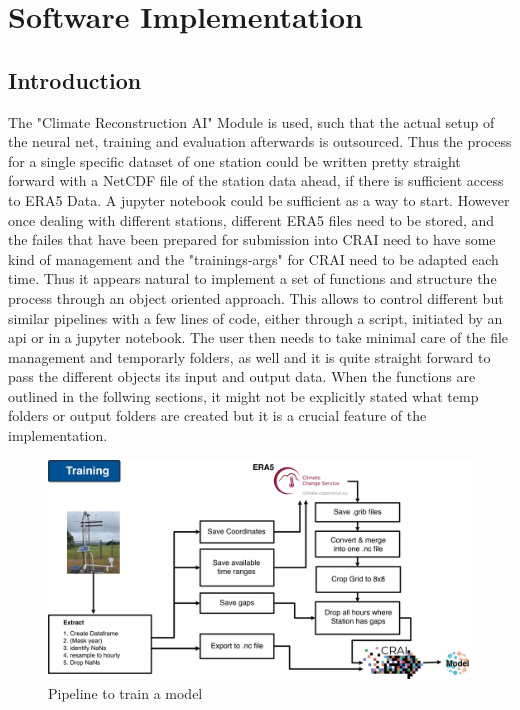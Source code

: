 \section{Software Implementation}
\label{sec:implementation}

\subsection{Introduction}

The "Climate Reconstruction AI" Module is used, such that the actual setup of the neural net, training and evaluation afterwards is outsourced. Thus the process for a single specific dataset of one station could be written pretty straight forward with a NetCDF file of the station data ahead, if there is sufficient access to ERA5 Data. A jupyter notebook could be sufficient as a way to start. However once dealing with different stations, different ERA5 files need to be stored, and the failes that have been prepared for submission into CRAI need to have some kind of management and the "trainings-args" for CRAI need to be adapted each time. Thus it appears natural to implement a set of functions and structure the process through an object oriented approach. This allows to control different but similar pipelines with a few lines of code, either through a script, initiated by an api or in a jupyter notebook.
The user then needs to take minimal care of the file management and temporarly folders, as well and it is quite straight forward to pass the different objects its input and output data. When the functions are outlined in the follwing sections, it might not be explicitly stated what temp folders or output folders are created but it is a crucial feature of the implementation.

\begin{figure}
    \centering
    \includegraphics[width=450pt]{resources/images/training_pipeline.png}
    \caption{Pipeline to train a model}
    \label{fig:training_pipeline}
\end{figure}

